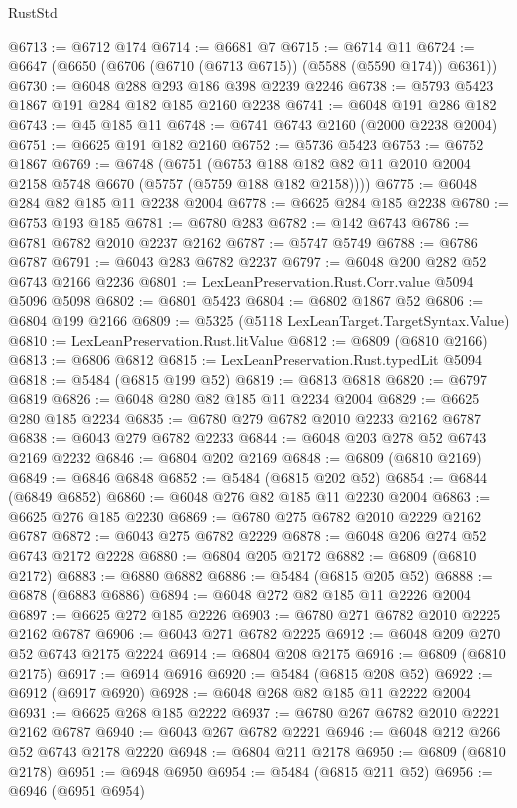\begin{lexlean}{RustStd}
\begin{coremodule}
@6713 := @6712 @174
@6714 := @6681 @7
@6715 := @6714 @11
@6724 := @6647 (@6650 (@6706 (@6710 (@6713 @6715)) (@5588 (@5590 @174)) @6361))
@6730 := @6048 @288 @293 @186 @398 @2239 @2246
@6738 := @5793 @5423 @1867 @191 @284 @182 @185 @2160 @2238
@6741 := @6048 @191 @286 @182
@6743 := @45 @185 @11
@6748 := @6741 @6743 @2160 (@2000 @2238 @2004)
@6751 := @6625 @191 @182 @2160
@6752 := @5736 @5423
@6753 := @6752 @1867
@6769 := @6748
    (@6751 (@6753 @188 @182 @82 @11 @2010 @2004 @2158 @5748 @6670 (@5757 (@5759 @188 @182 @2158))))
@6775 := @6048 @284 @82 @185 @11 @2238 @2004
@6778 := @6625 @284 @185 @2238
@6780 := @6753 @193 @185
@6781 := @6780 @283
@6782 := @142 @6743
@6786 := @6781 @6782 @2010 @2237 @2162
@6787 := @5747 @5749
@6788 := @6786 @6787
@6791 := @6043 @283 @6782 @2237
@6797 := @6048 @200 @282 @52 @6743 @2166 @2236
@6801 := LexLeanPreservation.Rust.Corr.value @5094 @5096 @5098
@6802 := @6801 @5423
@6804 := @6802 @1867 @52
@6806 := @6804 @199 @2166
@6809 := @5325 (@5118 LexLeanTarget.TargetSyntax.Value)
@6810 := LexLeanPreservation.Rust.litValue
@6812 := @6809 (@6810 @2166)
@6813 := @6806 @6812
@6815 := LexLeanPreservation.Rust.typedLit @5094
@6818 := @5484 (@6815 @199 @52)
@6819 := @6813 @6818
@6820 := @6797 @6819
@6826 := @6048 @280 @82 @185 @11 @2234 @2004
@6829 := @6625 @280 @185 @2234
@6835 := @6780 @279 @6782 @2010 @2233 @2162 @6787
@6838 := @6043 @279 @6782 @2233
@6844 := @6048 @203 @278 @52 @6743 @2169 @2232
@6846 := @6804 @202 @2169
@6848 := @6809 (@6810 @2169)
@6849 := @6846 @6848
@6852 := @5484 (@6815 @202 @52)
@6854 := @6844 (@6849 @6852)
@6860 := @6048 @276 @82 @185 @11 @2230 @2004
@6863 := @6625 @276 @185 @2230
@6869 := @6780 @275 @6782 @2010 @2229 @2162 @6787
@6872 := @6043 @275 @6782 @2229
@6878 := @6048 @206 @274 @52 @6743 @2172 @2228
@6880 := @6804 @205 @2172
@6882 := @6809 (@6810 @2172)
@6883 := @6880 @6882
@6886 := @5484 (@6815 @205 @52)
@6888 := @6878 (@6883 @6886)
@6894 := @6048 @272 @82 @185 @11 @2226 @2004
@6897 := @6625 @272 @185 @2226
@6903 := @6780 @271 @6782 @2010 @2225 @2162 @6787
@6906 := @6043 @271 @6782 @2225
@6912 := @6048 @209 @270 @52 @6743 @2175 @2224
@6914 := @6804 @208 @2175
@6916 := @6809 (@6810 @2175)
@6917 := @6914 @6916
@6920 := @5484 (@6815 @208 @52)
@6922 := @6912 (@6917 @6920)
@6928 := @6048 @268 @82 @185 @11 @2222 @2004
@6931 := @6625 @268 @185 @2222
@6937 := @6780 @267 @6782 @2010 @2221 @2162 @6787
@6940 := @6043 @267 @6782 @2221
@6946 := @6048 @212 @266 @52 @6743 @2178 @2220
@6948 := @6804 @211 @2178
@6950 := @6809 (@6810 @2178)
@6951 := @6948 @6950
@6954 := @5484 (@6815 @211 @52)
@6956 := @6946 (@6951 @6954)

\end{coremodule}
\end{lexlean}
